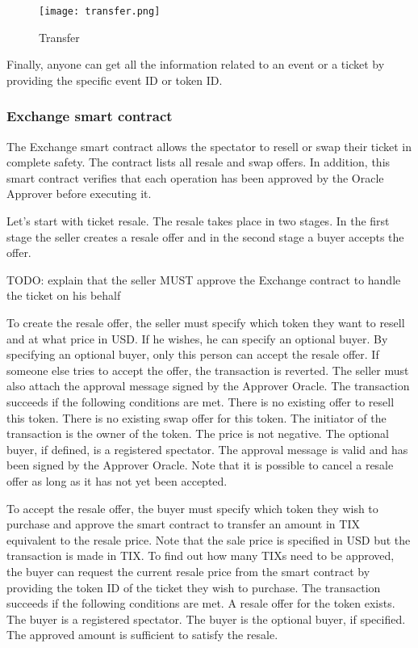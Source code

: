 \documentclass[a4paper,11pt,oneside]{report}
\begin{document}
\begin{figure}[h!]
  \centering
  \texttt{[image: transfer.png]}
  \caption{Transfer}
  \label{fig:transfer}
\end{figure}

Finally, anyone can get all the information related to an event or a ticket by providing the specific event ID or token ID.

\subsubsection{Exchange smart contract}
The Exchange smart contract allows the spectator to resell or swap their ticket in complete safety. The contract lists all resale and swap offers. In addition, this smart contract verifies that each operation has been approved by the Oracle Approver before executing it.

Let's start with ticket resale. The resale takes place in two stages. In the first stage the seller creates a resale offer and in the second stage a buyer accepts the offer.

TODO: explain that the seller MUST approve the Exchange contract to handle the ticket on his behalf

To create the resale offer, the seller must specify which token they want to resell and at what price in USD. If he wishes, he can specify an optional buyer. By specifying an optional buyer, only this person can accept the resale offer. If someone else tries to accept the offer, the transaction is reverted. The seller must also attach the approval message signed by the Approver Oracle. The transaction succeeds if the following conditions are met. There is no existing offer to resell this token. There is no existing swap offer for this token. The initiator of the transaction is the owner of the token. The price is not negative. The optional buyer, if defined, is a registered spectator. The approval message is valid and has been signed by the Approver Oracle. Note that it is possible to cancel a resale offer as long as it has not yet been accepted.

To accept the resale offer, the buyer must specify which token they wish to purchase and approve the smart contract to transfer an amount in TIX equivalent to the resale price. Note that the sale price is specified in USD but the transaction is made in TIX. To find out how many TIXs need to be approved, the buyer can request the current resale price from the smart contract by providing the token ID of the ticket they wish to purchase. The transaction succeeds if the following conditions are met. A resale offer for the token exists. The buyer is a registered spectator. The buyer is the optional buyer, if specified. The approved amount is sufficient to satisfy the resale.
\end{document}
